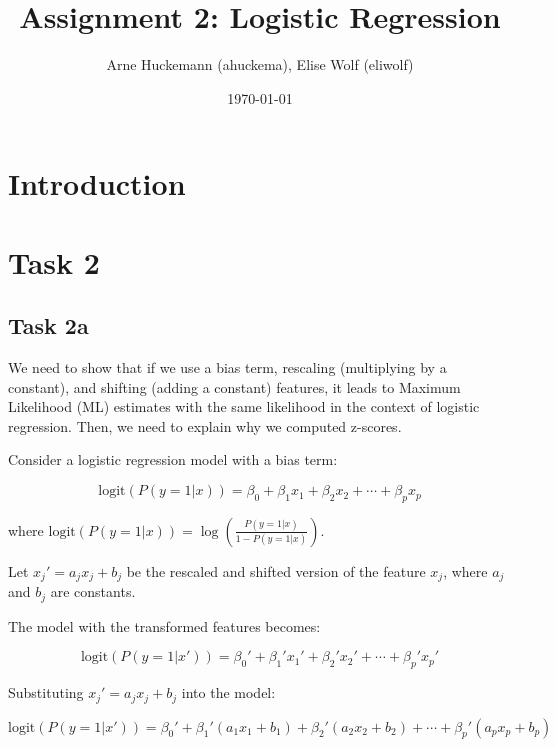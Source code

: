 \documentclass[a4paper,oneside,bibliography=totoc]{scrartcl}
\begin{document}
\subject{Report - Machine Learning (HWS 2024)} %
\title{Assignment 2: Logistic Regression}
\author{Arne Huckemann (ahuckema), Elise Wolf (eliwolf)}
\date{\today}
\maketitle


\begin{abstract}
\end{abstract}


\section{Introduction}
\label{ch:intro}



\section{Task 2}

\subsection{Task 2a}

We need to show that if we use a bias term, rescaling (multiplying by a constant), and shifting (adding a constant) features, it leads to Maximum Likelihood (ML) estimates with the same likelihood in the context of logistic regression. Then, we need to explain why we computed z-scores.

Consider a logistic regression model with a bias term:

\[
\text{logit}(P(y=1|x)) = \beta_0 + \beta_1 x_1 + \beta_2 x_2 + \cdots + \beta_p x_p
\]

where \( \text{logit}(P(y=1|x)) = \log\left(\frac{P(y=1|x)}{1 - P(y=1|x)}\right) \).

Let \( x_j' = a_j x_j + b_j \) be the rescaled and shifted version of the feature \( x_j \), where \( a_j \) and \( b_j \) are constants.

The model with the transformed features becomes:

\[
\text{logit}(P(y=1|x')) = \beta_0' + \beta_1' x_1' + \beta_2' x_2' + \cdots + \beta_p' x_p'
\]

Substituting \( x_j' = a_j x_j + b_j \) into the model:

\[
\text{logit}(P(y=1|x')) = \beta_0' + \beta_1' (a_1 x_1 + b_1) + \beta_2' (a_2 x_2 + b_2) + \cdots + \beta_p' (a_p x_p + b_p)
\]
\end{document}
